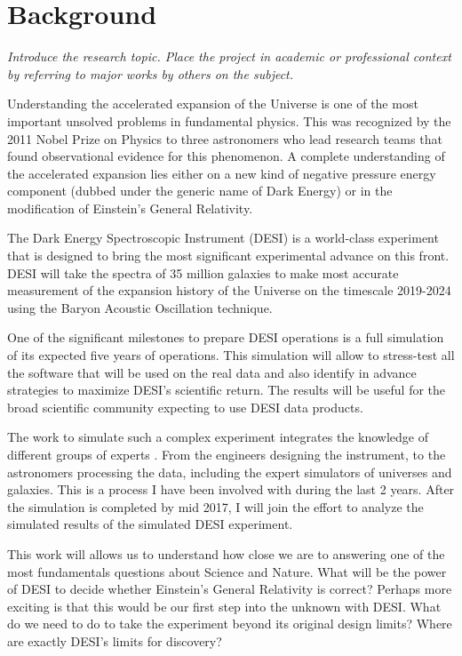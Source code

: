 \documentclass[12pt]{article}
\begin{document}
\section*{Background}
\textit{Introduce the research topic. Place the project in academic or
professional context by referring to major works by others on the
subject. }

Understanding the accelerated expansion of the Universe is one of the
most important unsolved problems in fundamental physics.  
This was recognized by the 2011 Nobel Prize on Physics to three
astronomers who lead research teams that found observational evidence for
this phenomenon.  A complete understanding of the accelerated
expansion lies either on a new kind of negative pressure energy
component (dubbed under the generic name of Dark Energy) or in the
modification of Einstein's General Relativity. 

The Dark Energy Spectroscopic Instrument (DESI) is a world-class
experiment that is designed to bring the most significant experimental
advance on this front. 
DESI will take the spectra of 35 million galaxies to make most
accurate measurement of the expansion history of the Universe on the
timescale 2019-2024 using the Baryon Acoustic Oscillation technique.  

One of the significant milestones to prepare DESI operations is a
full simulation of its expected five years of operations.
This simulation will allow to stress-test all the software that will
be used on the real data and also identify in advance strategies to
maximize DESI's scientific return.  
The results will be useful for the broad scientific community
expecting to use DESI data products.

The work to simulate such a complex experiment integrates the knowledge of
different groups of experts \cite{2016A&C....15....1N}. From the
engineers designing   the instrument, to the astronomers processing
the data, including the expert simulators of universes and
galaxies. This is a process I have been involved with during the last
2 years.
After the simulation is completed by mid 2017, I will join the effort
to analyze the simulated results of the simulated DESI experiment.

 
This work will allows us to understand how close we are to answering
one of the most fundamentals questions about Science and Nature. What
will be the power of DESI to decide whether Einstein's General
Relativity is correct?  
Perhaps more exciting is that this would be our first step into the
unknown with DESI. What do we need to do to take the experiment beyond its
original design limits? Where are exactly DESI's limits for discovery?
\end{document}
